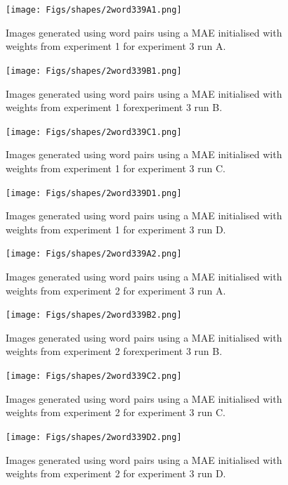 \begin{figure}
\centering
\texttt{[image: Figs/shapes/2word339A1.png]}
\caption{Images generated using word pairs using a MAE initialised with weights from experiment 1 for experiment 3 run A.}
\label{fig:2word339A1}
\end{figure}

\begin{figure}
\centering
\texttt{[image: Figs/shapes/2word339B1.png]}
\caption{Images generated using word pairs using a MAE initialised with weights from experiment 1 forexperiment 3 run B.}
\label{fig:2word339B1}
\end{figure}

\begin{figure}
\centering
\texttt{[image: Figs/shapes/2word339C1.png]}
\caption{Images generated using word pairs using a MAE initialised with weights from experiment 1 for experiment 3 run C.}
\label{fig:2word339C1}
\end{figure}

\begin{figure}
\centering
\texttt{[image: Figs/shapes/2word339D1.png]}
\caption{Images generated using word pairs using a MAE initialised with weights from experiment 1 for experiment 3 run D.}
\label{fig:2word339D1}
\end{figure}

\begin{figure}
\centering
\texttt{[image: Figs/shapes/2word339A2.png]}
\caption{Images generated using word pairs using a MAE initialised with weights from experiment 2 for experiment 3 run A.}
\label{fig:2word339A2}
\end{figure}

\begin{figure}
\centering
\texttt{[image: Figs/shapes/2word339B2.png]}
\caption{Images generated using word pairs using a MAE initialised with weights from experiment 2 forexperiment 3 run B.}
\label{fig:2word339B2}
\end{figure}

\begin{figure}
\centering
\texttt{[image: Figs/shapes/2word339C2.png]}
\caption{Images generated using word pairs using a MAE initialised with weights from experiment 2 for experiment 3 run C.}
\label{fig:2word339C2}
\end{figure}

\begin{figure}
\centering
\texttt{[image: Figs/shapes/2word339D2.png]}
\caption{Images generated using word pairs using a MAE initialised with weights from experiment 2 for experiment 3 run D.}
\label{fig:2word339D2}
\end{figure}




